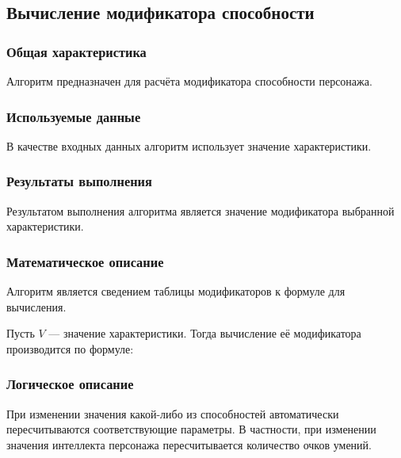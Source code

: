\subsection{Вычисление модификатора способности}

\subsubsection{Общая характеристика}

Алгоритм предназначен для расчёта модификатора способности персонажа.

\subsubsection{Используемые данные}

В качестве входных данных алгоритм использует значение характеристики.

\subsubsection{Результаты выполнения}

Результатом выполнения алгоритма является значение модификатора выбранной характеристики.

\subsubsection{Математическое описание}

Алгоритм является сведением таблицы модификаторов\cite{PHB} к формуле для вычисления.

Пусть $V$ --- значение характеристики. Тогда вычисление её модификатора производится по формуле:

\subsubsection{Логическое описание}

При изменении значения какой-либо из способностей автоматически пересчитываются соответствующие параметры. В частности, при изменении значения интеллекта персонажа пересчитывается количество очков умений.
